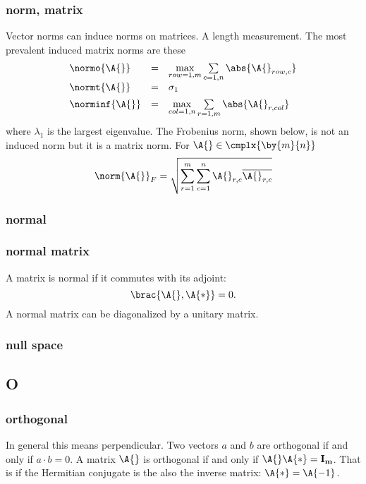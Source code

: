 \subsubsection*{norm, matrix}
Vector norms can induce norms on matrices. A length measurement.
The most prevalent induced matrix norms are these
\begin{equation}
\begin{array}{ lcl }
    \normo{\A{}}   &=& \max\limits_{row=1,m}\sum\limits_{c=1,n}{\abs{\A{}_{row,c}}} \\[5pt]
    \normt{\A{}}   &=& \sigma_{1} \\[5pt]
    \norminf{\A{}} &=& \max\limits_{col=1,n}\sum\limits_{r=1,m}{\abs{\A{}_{r,col}}} \\
\end{array}
\end{equation}
where $\lambda_{1}$ is the largest eigenvalue.
The Frobenius norm, shown below, is not an induced norm but it is a matrix norm. For $\A{}\in\cmplx{\by{m}{n}}$
\begin{equation}
  \norm{\A{}}_F = \sqrt{\sum_{r=1}^{m}{\sum_{c=1}^{n}{\A{}_{r,c}\overline{\A{}_{r,c}}}}}
\end{equation}

\subsubsection*{normal}

\subsubsection*{normal matrix}
A matrix is normal if it commutes with its adjoint:
\begin{equation}
  \brac{ \A{}, \A{*} } = 0.
\end{equation}
A normal matrix can be diagonalized by a unitary matrix.

\subsubsection*{null space}

\subsection*{O} 

\subsubsection*{orthogonal}
In general this means perpendicular. Two vectors $a$ and $b$ are orthogonal if and only if $a\cdot b=0$. A matrix $\A{}$ is orthogonal if and only if $\A{}\A{*} = \bf{I}_m $. That is if the Hermitian conjugate is the also the inverse matrix: $\A{*}=\A{-1}$.

